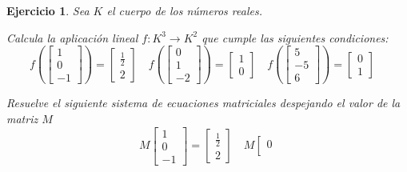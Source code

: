 \documentclass[12pt]{amsart}
\newtheorem{ejer}{Ejercicio}
\begin{document}
\begin{ejer} Sea $K$ el cuerpo de los n\'umeros reales.
\newline
\noindent\begin{minipage}{\textwidth}
\begin{tcolorbox}[colback = green!20!white,title=Versión Aplicación]
Calcula la aplicaci\'on lineal $f:K^{3} \to K^{2}$ que cumple las siguientes condiciones: 
\[f\left(\left[\begin{array}{r}
1 \\
0 \\
-1
\end{array}\right]\right) = \left[\begin{array}{r}
\frac{1}{2} \\
2
\end{array}\right] \quad f\left(\left[\begin{array}{r}
0 \\
1 \\
-2
\end{array}\right]\right) = \left[\begin{array}{r}
1 \\
0
\end{array}\right] \quad f\left(\left[\begin{array}{r}
5 \\
-5 \\
6
\end{array}\right]\right) = \left[\begin{array}{r}
0 \\
1
\end{array}\right] \quad 
\]\end{tcolorbox}
\end{minipage} \newline
\noindent\begin{minipage}{\textwidth}
\begin{tcolorbox}[colback = blue!20!white,title=Versión Sistema Matricial]
Resuelve el siguiente sistema de ecuaciones matriciales despejando el valor de la matriz $M$
\[M \left[\begin{array}{r}
1 \\
0 \\
-1
\end{array}\right] = \left[\begin{array}{r}
\frac{1}{2} \\
2
\end{array}\right] \quad M \left[\begin{array}{r}
0 \\

\end{array}\]
\end{tcolorbox}
\end{minipage}
\end{ejer}
\end{document}
